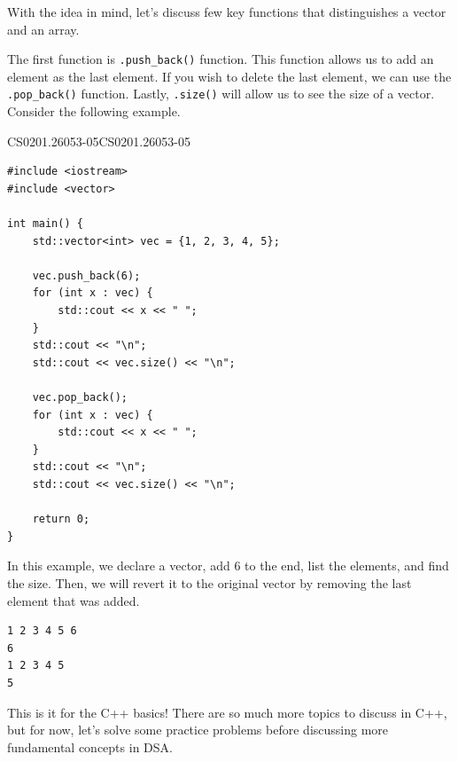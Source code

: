 \documentclass[../../main.tex]{subfiles}
\begin{document}
With the idea in mind, let's discuss few key functions that
distinguishes a vector and an array.

The first function is \verb|.push_back()| function. This function
allows us to add an element as the last element. If you wish to
delete the last element, we can use the \verb|.pop_back()| function.
Lastly, \verb|.size()| will allow us to see the size of a vector.
Consider the following example.

\begin{cppbox}{CS0201.26053-05}{CS0201.26053-05}
\begin{lstlisting}[style=cppstyle]
#include <iostream>
#include <vector>

int main() {
    std::vector<int> vec = {1, 2, 3, 4, 5};
    
    vec.push_back(6);
    for (int x : vec) {
        std::cout << x << " ";
    }
    std::cout << "\n";
    std::cout << vec.size() << "\n";

    vec.pop_back();
    for (int x : vec) {
        std::cout << x << " ";
    }
    std::cout << "\n";
    std::cout << vec.size() << "\n";

    return 0;
}
\end{lstlisting}
\end{cppbox}

In this example, we declare a vector, add $6$ to the end, list the
elements, and find the size. Then, we will revert it to the original
vector by removing the last element that was added.

\begin{outputbox}
\begin{lstlisting}[style=basic]
1 2 3 4 5 6
6
1 2 3 4 5
5
\end{lstlisting}
\end{outputbox}

This is it for the C++ basics! There are so much more topics to
discuss in C++, but for now, let's solve some practice problems
before discussing more fundamental concepts in DSA.
\end{document}
